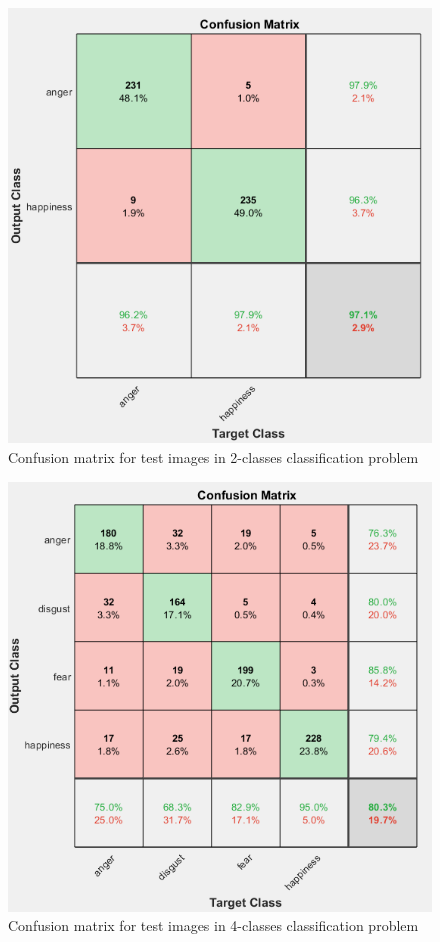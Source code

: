 \documentclass[a4paper]{report}
\begin{document}
	\begin{figure}[htbp]
		\centering
		\includegraphics[scale=0.7]{img/confusion_2class.png}
		\caption{Confusion matrix for test images in 2-classes classification problem}
		\label{img: confusion2classes}
	\end{figure}

	\begin{figure}[htbp]
		\centering
		\includegraphics[scale=0.7]{img/confusion_4class.png}
		\caption{Confusion matrix for test images in 4-classes classification problem}
		\label{img: confusion4classes}
	\end{figure}
\end{document}
